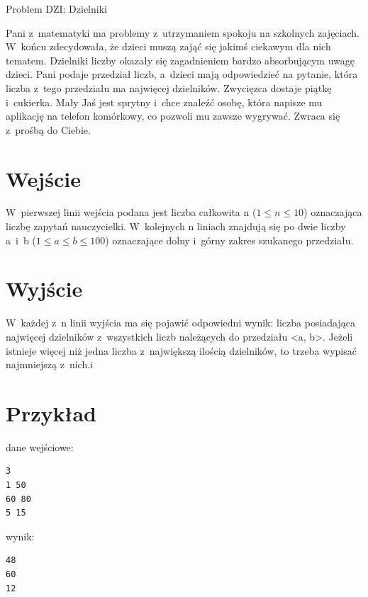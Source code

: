 \documentclass{article}
\begin{document}
\begin{center}
  \begin{Huge}
    Problem DZI: Dzielniki
  \end{Huge}
\end{center}

Pani z~matematyki ma problemy z~utrzymaniem spokoju na szkolnych zajęciach. W~końcu
zdecydowała, że dzieci muszą zająć się jakimś ciekawym dla nich tematem. Dzielniki liczby
okazały się zagadnieniem bardzo absorbującym uwagę dzieci. Pani podaje przedział liczb, a~dzieci
mają odpowiedzieć na pytanie, która liczba z~tego przedziału ma najwięcej dzielników. Zwycięzca
dostaje piątkę i~cukierka. Mały Jaś jest sprytny i~chce znaleźć osobę, która napisze mu aplikację na
telefon komórkowy, co pozwoli mu zawsze wygrywać. Zwraca się z~prośbą do Ciebie.

\section*{Wejście}

W~pierwszej linii wejścia podana jest liczba całkowita n ($1 \leqslant n \leqslant 10$) oznaczająca liczbę zapytań
nauczycielki. W~kolejnych n liniach znajdują się po dwie liczby a~i~b ($1 \leqslant a \leqslant b \leqslant 100$) oznaczające
dolny i~górny zakres szukanego przedziału.

\section*{Wyjście}

W~każdej z~n linii wyjścia ma się pojawić odpowiedni wynik: liczba posiadająca najwięcej
dzielników z~wszystkich liczb należących do przedziału <a, b>. Jeżeli istnieje więcej niż jedna
liczba z~największą ilością dzielników, to trzeba wypisać najmniejszą z~nich.i

\section*{Przykład}
dane wejściowe:
\begin{verbatim}
3
1 50
60 80
5 15
\end{verbatim}
wynik:
\begin{verbatim}
48
60
12
\end{verbatim}
\end{document}
